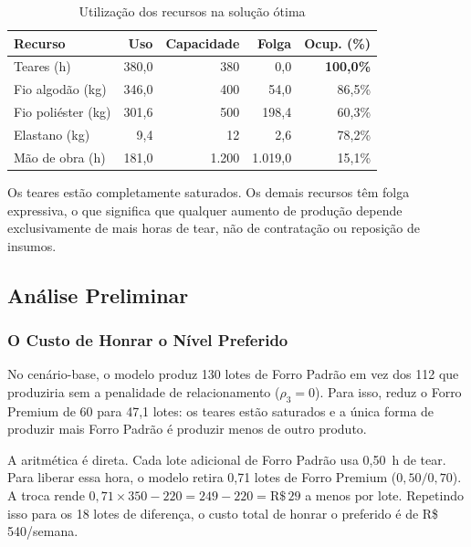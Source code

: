 \begin{table}[H]
\centering
\caption{Utilização dos recursos na solução ótima}
\label{tab:util_base}
\begin{tabular}{lrrrr}
\toprule
\textbf{Recurso} & \textbf{Uso} & \textbf{Capacidade} & \textbf{Folga} & \textbf{Ocup. (\%)} \\
\midrule
Teares (h)            & 380,0  & 380   &   0,0   & \textbf{100,0\%} \\
Fio algodão (kg)      & 346,0  & 400   &  54,0   & 86,5\% \\
Fio poliéster (kg)    & 301,6  & 500   & 198,4   & 60,3\% \\
Elastano (kg)         &   9,4  &  12   &   2,6   & 78,2\% \\
Mão de obra (h)       & 181,0  & 1.200 & 1.019,0 & 15,1\% \\
\bottomrule
\end{tabular}
\end{table}

Os teares estão completamente saturados. Os demais recursos têm folga
expressiva, o que significa que qualquer aumento de produção depende
exclusivamente de mais horas de tear, não de contratação ou reposição de insumos.

\newpage

\subsection{Análise Preliminar}
\label{sec:analise_r2}

\subsubsection{O Custo de Honrar o Nível Preferido}

No cenário-base, o modelo produz 130 lotes de Forro Padrão em vez dos 112 que
produziria sem a penalidade de relacionamento ($\rho_3 = 0$). Para isso, reduz
o Forro Premium de 60 para 47,1 lotes: os teares estão saturados e a única
forma de produzir mais Forro Padrão é produzir menos de outro produto.

A aritmética é direta. Cada lote adicional de Forro Padrão usa 0,50~h de tear.
Para liberar essa hora, o modelo retira 0,71 lotes de Forro Premium
($0{,}50/0{,}70$). A troca rende $0{,}71 \times 350 - 220 = 249 - 220 =
\text{R\$}\,29$ a menos por lote. Repetindo isso para os 18 lotes de diferença,
o custo total de honrar o preferido é de R\$\,540/semana.

